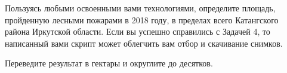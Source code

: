 
Пользуясь любыми освоенными вами технологиями, определите площадь, пройденную лесными пожарами в 2018 году, в пределах 
всего Катангского района Иркутской области. Если вы успешно справились с Задачей 4, то написанный вами скрипт может облегчить вам отбор и скачивание снимков.

Переведите результат в гектары и округлите до десятков.